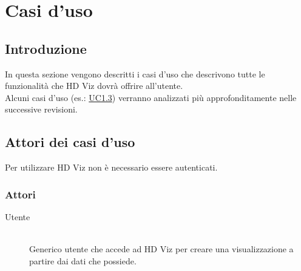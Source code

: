 \section{Casi d'uso}
    \subsection{Introduzione}
    In questa sezione vengono descritti i casi d'uso che descrivono tutte le funzionalità che HD Viz dovrà offrire all'utente.
    \\
    Alcuni casi d'uso (es.: \hyperref[uc1.3]{UC1.3}) verranno analizzati più approfonditamente nelle successive revisioni. 
    \subsection{Attori dei casi d'uso}
    Per utilizzare HD Viz non è necessario essere autenticati.
    \subsubsection{Attori}
    \begin{description}
        \item[Utente] \hfill \\Generico utente che accede ad HD Viz per creare una visualizzazione a partire dai dati che possiede.
    \end{description}
    
    \pagebreak
    
    \pagebreak
    
    \pagebreak
    
    \pagebreak
    
    \pagebreak
    
    \pagebreak
    
    \pagebreak
    
    \pagebreak
    
    \pagebreak
    